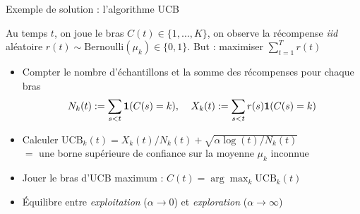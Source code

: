 \documentclass[11pt,english,ignorenonframetext,]{beamer}
\begin{document}
\begin{frame}{Exemple de solution : l'algorithme UCB}

Au temps $t$, on joue le bras $C(t)\in\{1,\dots,K\}$, on observe la récompense \emph{iid} aléatoire $r(t) \sim \mathrm{Bernoulli}(\mu_k) \in\{0,1\}$.
But : maximiser $\sum\limits_{t=1}^T r(t)$

\pause
\begin{itemize}
  \item
  Compter le nombre d'échantillons et la somme des récompenses pour chaque bras
  \[
    N_k(t) := \sum\limits_{s < t} \bold{1}(C(s)=k),
    \;\;\;\;
    X_k(t) := \sum\limits_{s < t} r(s) \bold{1}(C(s)=k)
  \]
  \pause
    \item
  Calculer $\mathrm{UCB}_k(t) = X_k(t) / N_k(t) + \sqrt{\alpha \log(t) / N_k(t)}$ \\
  $=$ une borne supérieure de confiance sur la moyenne $\mu_k$ \alert{inconnue}
  \item
  Jouer le bras d'UCB maximum : $C(t) = \arg\max_k \mathrm{UCB}_k(t)$
    \item
  Équilibre entre \emph{exploitation} ($\alpha\to0$) et \emph{exploration}  ($\alpha\to\infty$)
\end{itemize}

\end{frame}


\end{document}

